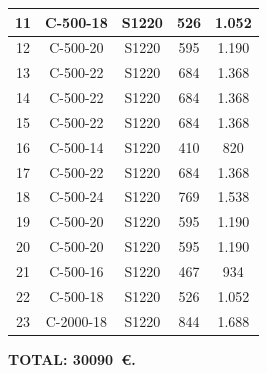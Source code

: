\begin{table}[H]
\begin{tabular}{|c|c|c|c|c|}
11                & C-500-18              & S1220           & 526                & 1.052                  \\ \hline
12                & C-500-20              & S1220           & 595                & 1.190                  \\ \hline
13                & C-500-22              & S1220           & 684                & 1.368                  \\ \hline
14                & C-500-22              & S1220           & 684                & 1.368                  \\ \hline
15                & C-500-22              & S1220           & 684                & 1.368                  \\ \hline
16                & C-500-14              & S1220           & 410                & 820                    \\ \hline
17                & C-500-22              & S1220           & 684                & 1.368                  \\ \hline
18                & C-500-24              & S1220           & 769                & 1.538                  \\ \hline
19                & C-500-20              & S1220           & 595                & 1.190                  \\ \hline
20                & C-500-20              & S1220           & 595                & 1.190                  \\ \hline
21                & C-500-16              & S1220           & 467                & 934                    \\ \hline
22                & C-500-18              & S1220           & 526                & 1.052                  \\ \hline
23                & C-2000-18             & S1220           & 844                & 1.688                  \\ \hline
\end{tabular}
\label{tab:presupuesto-parcialApoyos}
\end{table}
\textbf{TOTAL: \SI{30090}{€}.}
